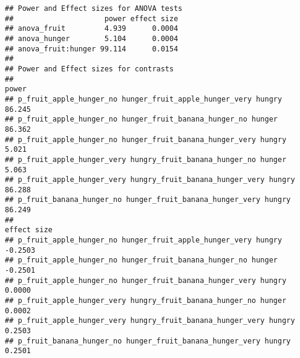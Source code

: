 \documentclass[]{article}
\begin{document}
\begin{verbatim}
## Power and Effect sizes for ANOVA tests
##                     power effect size
## anova_fruit         4.939      0.0004
## anova_hunger        5.104      0.0004
## anova_fruit:hunger 99.114      0.0154
## 
## Power and Effect sizes for contrasts
##                                                                   power
## p_fruit_apple_hunger_no hunger_fruit_apple_hunger_very hungry    86.245
## p_fruit_apple_hunger_no hunger_fruit_banana_hunger_no hunger     86.362
## p_fruit_apple_hunger_no hunger_fruit_banana_hunger_very hungry    5.021
## p_fruit_apple_hunger_very hungry_fruit_banana_hunger_no hunger    5.063
## p_fruit_apple_hunger_very hungry_fruit_banana_hunger_very hungry 86.288
## p_fruit_banana_hunger_no hunger_fruit_banana_hunger_very hungry  86.249
##                                                                  effect size
## p_fruit_apple_hunger_no hunger_fruit_apple_hunger_very hungry        -0.2503
## p_fruit_apple_hunger_no hunger_fruit_banana_hunger_no hunger         -0.2501
## p_fruit_apple_hunger_no hunger_fruit_banana_hunger_very hungry        0.0000
## p_fruit_apple_hunger_very hungry_fruit_banana_hunger_no hunger        0.0002
## p_fruit_apple_hunger_very hungry_fruit_banana_hunger_very hungry      0.2503
## p_fruit_banana_hunger_no hunger_fruit_banana_hunger_very hungry       0.2501
\end{verbatim}
\end{document}
